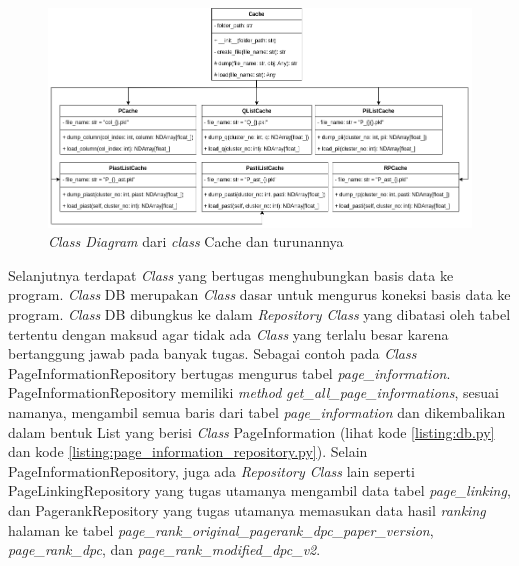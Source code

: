 \begin{figure}[H]
  \centering
  \includegraphics[keepaspectratio, width={\textwidth}]{gambar/cache_class_diagram}
  \caption{\textit{Class Diagram} dari \textit{class} Cache dan turunannya}
	\label{gambar:cache_class_diagram}
\end{figure}

Selanjutnya terdapat \textit{Class} yang bertugas menghubungkan basis data ke program. \textit{Class} DB merupakan \textit{Class} dasar untuk mengurus koneksi basis data ke program. \textit{Class} DB dibungkus ke dalam \textit{Repository Class} yang dibatasi oleh tabel tertentu dengan maksud agar tidak ada \textit{Class} yang terlalu besar karena bertanggung jawab pada banyak tugas. Sebagai contoh pada \textit{Class} PageInformationRepository bertugas mengurus tabel \textit{page\_information}. PageInformationRepository memiliki \textit{method} \textit{get\_all\_page\_informations}, sesuai namanya, mengambil semua baris dari tabel \textit{page\_information} dan dikembalikan dalam bentuk List yang berisi \textit{Class} PageInformation (lihat kode \ref{listing:db.py} dan kode \ref{listing:page_information_repository.py}). Selain PageInformationRepository, juga ada \textit{Repository Class} lain seperti PageLinkingRepository yang tugas utamanya mengambil data tabel \textit{page\_linking}, dan PagerankRepository yang tugas utamanya memasukan data hasil \textit{ranking} halaman ke tabel \textit{page\_rank\_original\_pagerank\_dpc\_paper\_version}, \textit{page\_rank\_dpc}, dan \textit{page\_rank\_modified\_dpc\_v2}.


